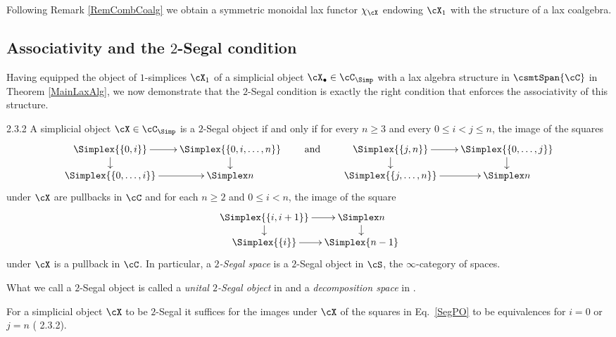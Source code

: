 \documentclass[a4paper]{article}
\numberwithin{equation}{section}
\begin{document}
\begin{remark}
 Following Remark \ref{RemCombCoalg} we obtain a symmetric monoidal lax functor $\chi_\cX$ endowing $\cX_1$ with the structure of a lax coalgebra.
\end{remark}




\subsection{Associativity and the \texorpdfstring{$2$}{2}-Segal condition}
\label{Sec:SegAssoc}

Having equipped the object of $1$-simplices $\cX_1$ of a simplicial object $\cX_\bullet\in \cC_{\Simp}$ with a lax algebra structure in $\csmtSpan{\cC}$ in Theorem \ref{MainLaxAlg}, we now demonstrate that the $2$-Segal condition is exactly the right condition that enforces the associativity of this structure. 


\begin{defn}{\cite{DK12} 2.3.2}
\label{2SegDefn}
A simplicial object $\cX \in \cC_\Simp$ is a $2$-Segal object if and only if for every $n\geq 3$ and every $0 \leq i < j \leq n$, the image of the squares 
\begin{equation}
\label{SegPO}
 \xymatrixrowsep{.9pc}\xymatrixcolsep{1.5pc} \xymatrix{ \Simplex{\{0,i\}} \ar[r] \ar[d] & \Simplex{\{0,i,\ldots,n\}} \ar[d] &{\rm and} & \Simplex{\{j,n\}} \ar[r] \ar[d] & \Simplex{\{0,\ldots,j\}} \ar[d] \\
 \Simplex{\{0,\ldots, i\}} \ar[r] & \Simplex n &  & \Simplex{\{j,\ldots,n\}} \ar[r] & \Simplex n}
\end{equation}
under $\cX$ are pullbacks in $\cC$ and for each $n \geq 2$ and $0 \leq i < n$, the image of the square
\begin{equation}
\label{SegUn}
 \xymatrixcolsep{.8pc}\xymatrixrowsep{.8pc}\xymatrix{\Simplex{\{i,i+1\}} \ar[r] \ar[d] & \Simplex n \ar[d] \\
 \Simplex{\{i\}} \ar[r] & \Simplex{n-1}}
\end{equation}
under $\cX$ is a pullback in $\cC$. 
In particular, a {\em $2$-Segal space} is a $2$-Segal object in $\cS$, the $\infty$-category of spaces.
\end{defn}
\begin{remark}
 What we call a $2$-Segal object is called a {\em unital $2$-Segal object} in \cite{DK12} and a {\em decomposition space} in \cite{KockI}.
\end{remark}
\begin{remark}
 For a simplicial object $\cX$ to be $2$-Segal it suffices for the images under $\cX$ of the squares in Eq.~\ref{SegPO} to be equivalences for $i=0$ or $j=n$ (\cite{DK12} 2.3.2).
\end{remark}
\end{document}
